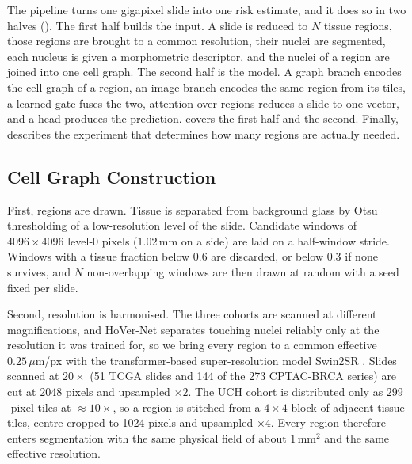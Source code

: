 \documentclass{midl} %
\begin{document}
The pipeline turns one gigapixel slide into one risk estimate, and it does so in two halves
().
The first half builds the input. A slide is reduced to $N$ tissue regions, those regions are
brought to a common resolution, their nuclei are segmented, each nucleus is given a
morphometric descriptor, and the nuclei of a region are joined into one cell graph. The second
half is the model. A graph branch encodes the cell graph of a region, an image branch encodes
the same region from its tiles, a learned gate fuses the two, attention over regions reduces a
slide to one vector, and a head produces the prediction.
 covers the first half and
 the second. Finally,
 describes the experiment that determines how many
regions are actually needed.

\subsection{Cell Graph Construction}
\label{sec:cell-graph-construction}

First, regions are drawn. Tissue is separated from background glass by Otsu thresholding of a
low-resolution level of the slide. Candidate windows of $4096 \times 4096$ level-0 pixels
($1.02$\,mm on a side) are laid on a half-window stride. Windows with a tissue fraction below
0.6 are discarded, or below 0.3 if none survives, and $N$ non-overlapping windows are then
drawn at random with a seed fixed per slide.

Second, resolution is harmonised. The three cohorts are scanned at different magnifications,
and HoVer-Net separates touching nuclei reliably only at the resolution it was trained for, so
we bring every region to a common effective $0.25\,\mu$m/px with the transformer-based
super-resolution model Swin2SR \citep{conde2022}. Slides scanned at $20\times$ (51 TCGA slides
and 144 of the 273 CPTAC-BRCA series) are cut at 2048 pixels and upsampled $\times 2$. The UCH
cohort is distributed only as $299$-pixel tiles at $\approx 10\times$, so a region is stitched
from a $4 \times 4$ block of adjacent tissue tiles, centre-cropped to 1024 pixels and upsampled
$\times 4$. Every region therefore enters segmentation with the same physical field of about
$1\,\mathrm{mm}^{2}$ and the same effective resolution.
\end{document}
